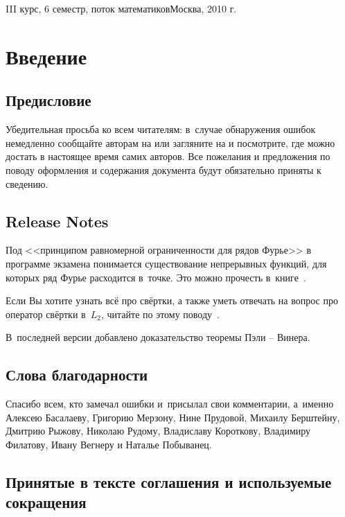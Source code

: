 \documentclass[a4paper]{article}
\begin{document}
{III курс, 6 семестр, поток математиков}{Москва, 2010 г.} \pagebreak

\pagestyle{plain}
\tableofcontents
\pagebreak

\section*{Введение}

\subsection*{Предисловие}

Убедительная просьба ко всем читателям: в~случае обнаружения ошибок
немедленно сообщайте авторам на \dmvnmail{} или загляните на \dmvnwebsite{} и посмотрите, где можно
достать в настоящее время самих авторов. Все пожелания и предложения по поводу оформления
и содержания документа будут обязательно приняты к сведению.

\subsection*{Release Notes}

Под <<принципом равномерной ограниченности для рядов Фурье>> в программе экзамена
понимается существование непрерывных функций, для которых ряд Фурье расходится в~точке.
Это можно прочесть в~книге~\hbox{\cite[гл.VIII,~\S1, п.\,1]{kf}}.

Если Вы хотите узнать всё про свёртки, а также уметь отвечать на вопрос про оператор свёртки в~$L_2$,
читайте по этому поводу~\cite[гл.\,III,~\S9]{bogachev}.

В~последней версии добавлено доказательство теоремы Пэли -- Винера.

\subsection*{Слова благодарности}

Спасибо всем, кто замечал ошибки и~присылал свои комментарии, а~именно Алексею Басалаеву, Григорию Мерзону,
Нине Прудовой, Михаилу Берштейну, Дмитрию Рыжову, Николаю Рудому, Владиславу Короткову, Владимиру Филатову, Ивану
Вегнеру и Наталье Побыванец.


\subsection*{Принятые в тексте соглашения и используемые сокращения}
\end{document}
